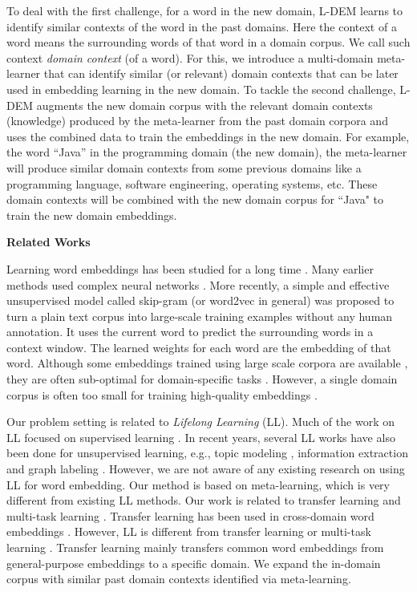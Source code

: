 To deal with the first challenge, for a word in the new domain, L-DEM learns to identify similar contexts of the word in the past domains. Here the context of a word means the surrounding words of that word in a domain corpus. We call such context \emph{domain context} (of a word). For this, we introduce a multi-domain meta-learner that can identify similar (or relevant) domain contexts that can be later used in embedding learning in the new domain. To tackle the second challenge, L-DEM augments the new domain corpus with the relevant domain contexts (knowledge) produced by the meta-learner from the past domain corpora and uses the combined data to train the embeddings in the new domain. For example, the word ``Java'' in the programming domain (the new domain), the meta-learner will produce similar domain contexts from some previous domains like a programming language, software engineering, operating systems, etc. These domain contexts will be combined with the new domain corpus for ``Java" to train the new domain embeddings.

\textbf{Related Works}
\label{chap3:rw}

Learning word embeddings has been studied for a long time \cite{mnih2007three}. 
Many earlier methods used complex neural networks \cite{mikolov2013linguistic}.
More recently, a simple and effective unsupervised model called skip-gram (or word2vec in general) \cite{mikolov2013distributed,mikolov2013linguistic} was proposed to turn a plain text corpus into large-scale training examples without any human annotation.
It uses the current word to predict the surrounding words in a context window.
The learned weights for each word are the embedding of that word.
Although some embeddings trained using large scale corpora are available \cite{pennington2014glove,bojanowski2016enriching}, they are often sub-optimal for domain-specific tasks \cite{bollegala-maehara-kawarabayashi:2015:ACL-IJCNLP,yang-lu-zheng:2017:EMNLP2017,xu_acl2018,Xu2018pro}. 
However, a single domain corpus is often too small for training high-quality embeddings \cite{Xu2018pro}.

Our problem setting is related to \textit{Lifelong Learning} (LL). Much of the work on LL focused on supervised learning \cite{Thrun1996learning,Silver2013,ChenLiu2016}.
In recent years, several LL works have also been done for unsupervised learning, e.g., topic modeling \cite{chen2014topic}, information extraction \cite{Mitchell2015} and graph labeling \cite{shu2016lifelong}. 
However, we are not aware of any existing research on using LL for word embedding. Our method is based on meta-learning, which is very different from existing LL methods.
Our work is related to transfer learning and multi-task learning \cite{pan2010survey}. Transfer learning has been used in cross-domain word embeddings \cite{bollegala-maehara-kawarabayashi:2015:ACL-IJCNLP,yang-lu-zheng:2017:EMNLP2017}. However, LL is different from transfer learning or multi-task learning \cite{ChenLiu2016}. 
Transfer learning mainly transfers common word embeddings from general-purpose embeddings to a specific domain. We expand the in-domain corpus with similar past domain contexts identified via meta-learning. 

